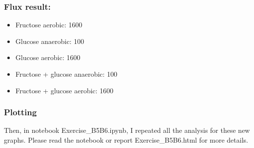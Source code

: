 \documentclass[]{article}
\begin{document}
\hypertarget{header-n254}{%
\subsubsection{Flux result:}\label{header-n254}}

\begin{itemize}
\item
  Fructose aerobic: 1600
\item
  Glucose anaerobic: 100
\item
  Glucose aerobic: 1600
\item
  Fructose + glucose anaerobic: 100
\item
  Fructose + glucose aerobic: 1600
\end{itemize}

\hypertarget{header-n271}{%
\subsubsection{Plotting}\label{header-n271}}

Then, in notebook Exercise\_B5B6.ipynb, I repeated all the analysis for
these new graphs. Please read the notebook or report Exercise\_B5B6.html
for more details.
\end{document}
